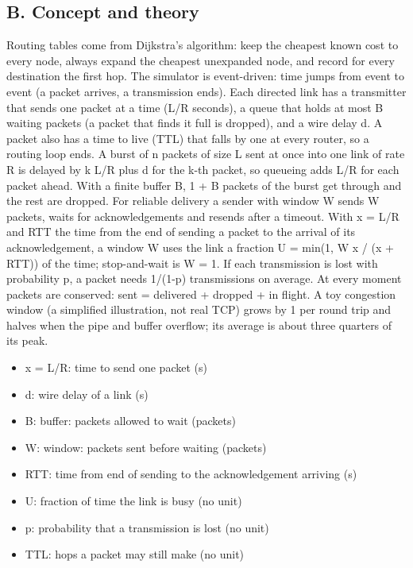 \documentclass[11pt,a4paper]{article}
\begin{document}
\subsection*{B. Concept and theory}
Routing tables come from Dijkstra's algorithm: keep the cheapest known cost to every node, always expand the cheapest unexpanded node, and record for every destination the first hop. The simulator is event-driven: time jumps from event to event (a packet arrives, a transmission ends). Each directed link has a transmitter that sends one packet at a time (L/R seconds), a queue that holds at most B waiting packets (a packet that finds it full is dropped), and a wire delay d. A packet also has a time to live (TTL) that falls by one at every router, so a routing loop ends. A burst of n packets of size L sent at once into one link of rate R is delayed by k L/R plus d for the k-th packet, so queueing adds L/R for each packet ahead. With a finite buffer B, 1 + B packets of the burst get through and the rest are dropped. For reliable delivery a sender with window W sends W packets, waits for acknowledgements and resends after a timeout. With x = L/R and RTT the time from the end of sending a packet to the arrival of its acknowledgement, a window W uses the link a fraction U = min(1, W x / (x + RTT)) of the time; stop-and-wait is W = 1. If each transmission is lost with probability p, a packet needs 1/(1-p) transmissions on average. At every moment packets are conserved: sent = delivered + dropped + in flight. A toy congestion window (a simplified illustration, not real TCP) grows by 1 per round trip and halves when the pipe and buffer overflow; its average is about three quarters of its peak.

\begin{itemize}[nosep]
\item x = L/R: time to send one packet (s)
\item d: wire delay of a link (s)
\item B: buffer: packets allowed to wait (packets)
\item W: window: packets sent before waiting (packets)
\item RTT: time from end of sending to the acknowledgement arriving (s)
\item U: fraction of time the link is busy (no unit)
\item p: probability that a transmission is lost (no unit)
\item TTL: hops a packet may still make (no unit)
\end{itemize}
\end{document}
